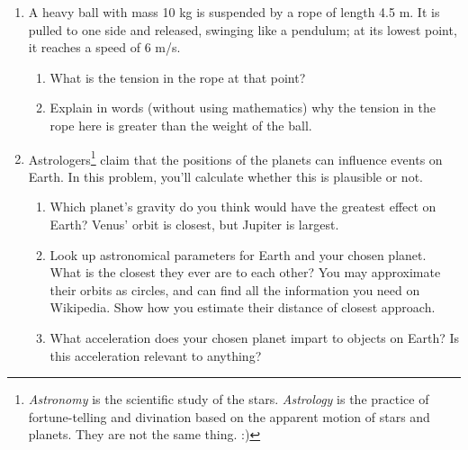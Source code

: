 \documentclass[12pt]{article}
\begin{document}
\Large
\centerline{}
\normalsize
\centerline{}

\begin{enumerate}

%
%
%
%
%
%
\item A heavy ball with mass 10 kg is suspended by a rope of length 4.5 m. It is pulled to one side and released, swinging like
a pendulum; at its lowest point, it reaches a speed of 6 m/s. 

\begin{enumerate}
	\item What is the tension in the rope at that point?
	\item Explain in words (without using mathematics) why the tension in the rope here is greater than the weight of the ball.
\end{enumerate}

\item Astrologers\footnote{{\it Astronomy} is the scientific study of the stars. {\it Astrology} is the practice of fortune-telling and divination based on the apparent motion of stars and planets. They are not the same thing. :)} claim that the positions of the planets can influence events on Earth. In this problem,
you'll calculate whether this is plausible or not.

\begin{enumerate}
\item Which planet's gravity do you think would have the greatest effect on Earth? Venus' orbit is closest,
but Jupiter is largest.
\item Look up astronomical parameters for Earth and your chosen planet. What is the closest they ever
are to each other? You may approximate their orbits as circles, and can find all the information you need
on Wikipedia. Show how you estimate their distance of closest approach.
\item What acceleration does your chosen planet impart to objects on Earth? Is this acceleration relevant 
to anything?
\end{enumerate}


\end{enumerate}
\end{document}
